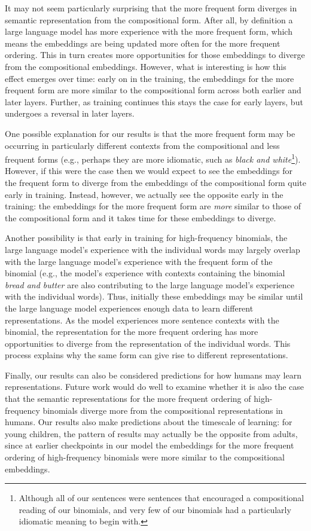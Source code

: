 \documentclass[
  12pt,
  letterpaper,
]{scrreprt}
\begin{document}
It may not seem particularly surprising that the more frequent form
diverges in semantic representation from the compositional form. After
all, by definition a large language model has more experience with the
more frequent form, which means the embeddings are being updated more
often for the more frequent ordering. This in turn creates more
opportunities for those embeddings to diverge from the compositional
embeddings. However, what is interesting is how this effect emerges over
time: early on in the training, the embeddings for the more frequent
form are more similar to the compositional form across both earlier and
later layers. Further, as training continues this stays the case for
early layers, but undergoes a reversal in later layers.

One possible explanation for our results is that the more frequent form
may be occurring in particularly different contexts from the
compositional and less frequent forms (e.g., perhaps they are more
idiomatic, such as \emph{black and white}\footnote{Although all of our
  sentences were sentences that encouraged a compositional reading of
  our binomials, and very few of our binomials had a particularly
  idiomatic meaning to begin with.}). However, if this were the case
then we would expect to see the embeddings for the frequent form to
diverge from the embeddings of the compositional form quite early in
training. Instead, however, we actually see the opposite early in the
training: the embeddings for the more frequent form are \emph{more}
similar to those of the compositional form and it takes time for these
embeddings to diverge.

Another possibility is that early in training for high-frequency
binomials, the large language model's experience with the individual
words may largely overlap with the large language model's experience
with the frequent form of the binomial (e.g., the model's experience
with contexts containing the binomial \emph{bread and butter} are also
contributing to the large language model's experience with the
individual words). Thus, initially these embeddings may be similar until
the large language model experiences enough data to learn different
representations. As the model experiences more sentence contexts with
the binomial, the representation for the more frequent ordering has more
opportunities to diverge from the representation of the individual
words. This process explains why the same form can give rise to
different representations.

Finally, our results can also be considered predictions for how humans
may learn representations. Future work would do well to examine whether
it is also the case that the semantic representations for the more
frequent ordering of high-frequency binomials diverge more from the
compositional representations in humans. Our results also make
predictions about the timescale of learning: for young children, the
pattern of results may actually be the opposite from adults, since at
earlier checkpoints in our model the embeddings for the more frequent
ordering of high-frequency binomials were more similar to the
compositional embeddings.
\end{document}
